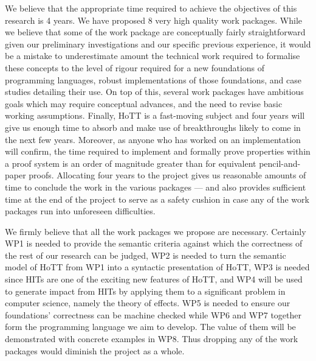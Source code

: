 \documentclass[a4paper,11pt]{article}
\begin{document}

\vspace{0.02in}

 We believe that the appropriate
time required to achieve the objectives of this research is 4
years. We have proposed 8 very high quality work packages. While we
believe that some of the work package are conceptually fairly
straightforward given our preliminary investigations and our specific
previous experience, it would be a mistake to  underestimate amount the
technical work required to formalise these concepts to the level of
rigour required for a new foundations of programming languages,
robust implementations of those foundations, and case studies
detailing their use. On top of this, several work packages have
ambitious goals 
which may require conceptual
advances,  and the need to revise basic working assumptions. Finally,
HoTT is a fast-moving subject and four years will give us enough time
to absorb and make use of breakthroughs likely to come in the next few
years. Moreover, as anyone who has worked on an implementation will
confirm, the time required to implement and formally prove properties
within a proof system is an order of magnitude greater than for
equivalent pencil-and-paper proofs. Allocating four years to the
project gives us reasonable amounts of time to conclude the work in
the various packages
--- and also
provides sufficient time at the end of the project to serve as a
safety cushion in case any of the work packages run into unforeseen
difficulties.

We firmly believe that all the work packages we propose are
necessary. Certainly WP1 is needed to provide the semantic criteria
against which the correctness of the rest of our research can be
judged, WP2 is needed to turn the semantic model of HoTT from WP1 into
a syntactic presentation of HoTT, WP3 is needed since HITs are one of
the exciting new features of HoTT, and WP4 will be used to generate
impact from HITs by applying them to a significant problem in computer
science, namely the theory of effects. WP5 is needed to ensure our
foundations' correctness can be machine checked while WP6 and WP7 
together form the programming language we aim to develop. The value of
them will be demonstrated with concrete examples in WP8.
Thus dropping any of the work packages would diminish the project as a whole.
\end{document}
